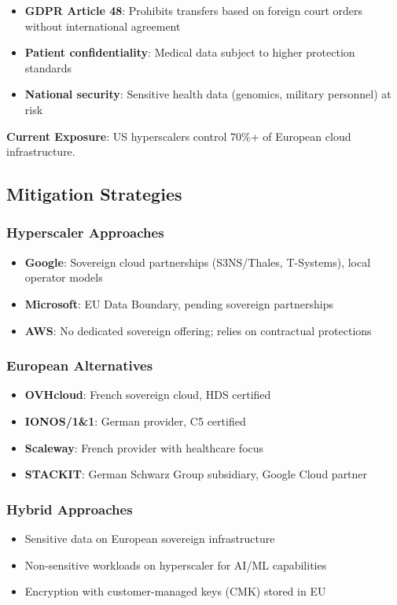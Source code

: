 \documentclass[11pt,a4paper]{article}
\begin{document}
\begin{itemize}
    \item \textbf{GDPR Article 48}: Prohibits transfers based on foreign court orders without international agreement
    \item \textbf{Patient confidentiality}: Medical data subject to higher protection standards
    \item \textbf{National security}: Sensitive health data (genomics, military personnel) at risk
\end{itemize}

\textbf{Current Exposure}: US hyperscalers control 70\%+ of European cloud infrastructure.

\subsection{Mitigation Strategies}

\subsubsection{Hyperscaler Approaches}
\begin{itemize}
    \item \textbf{Google}: Sovereign cloud partnerships (S3NS/Thales, T-Systems), local operator models
    \item \textbf{Microsoft}: EU Data Boundary, pending sovereign partnerships
    \item \textbf{AWS}: No dedicated sovereign offering; relies on contractual protections
\end{itemize}

\subsubsection{European Alternatives}
\begin{itemize}
    \item \textbf{OVHcloud}: French sovereign cloud, HDS certified
    \item \textbf{IONOS/1\&1}: German provider, C5 certified
    \item \textbf{Scaleway}: French provider with healthcare focus
    \item \textbf{STACKIT}: German Schwarz Group subsidiary, Google Cloud partner
\end{itemize}

\subsubsection{Hybrid Approaches}
\begin{itemize}
    \item Sensitive data on European sovereign infrastructure
    \item Non-sensitive workloads on hyperscaler for AI/ML capabilities
    \item Encryption with customer-managed keys (CMK) stored in EU
\end{itemize}
\end{document}
